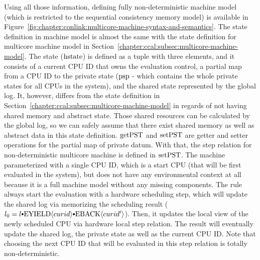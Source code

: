 Using all those information, defining fully non-deterministic machine model (which is restricted to the sequential consistency memory model) 
is available in Figure~\ref{fig:chapter:conlink:multicore-machine-syntax-and-semantics}.
The state definition in machine model is almost the same with the state definition for multicore machine model in Section~\ref{chapter:ccal:subsec:multicore-machine-model}. 
The state (${\mathrm{hstate}}$) is defined as a tuple with three elements, and it consists of a current CPU ID that owns the evaluation control,
a partial map from a CPU ID to the private state (${\mathrm{psp}}$ - which contains the whole private states for all CPUs in the system),
and the shared state represented by the global log. 
It, however, differs from the state definition in Section~\ref{chapter:ccal:subsec:multicore-machine-model} 
in regards of not having shared memory and abstract state. 
Those shared resources can be calculated by the global log, so we can safely assume that 
there exist shared memory as well as abstract data in this state definition. 
${\mathrm{getPST}}$ and ${\mathrm{setPST}}$ are getter and setter operations for the partial map of private datum. 
With that, 
the step relation for non-deterministic multicore machine is defined in ${\mathrm{setPST}}$. 
The machine parameterized with a single CPU ID, which is a start CPU (that will be first evaluated in the system),
but does not have any environmental context at all because it is a full machine model without any missing components. 
The rule always start the evaluation 
with a hardware scheduling step, which will update the shared log via memorizing 
the scheduling result ($l_0 = \listconsoppo{\yieldbackev{curid'}}{\listconsoppo{\yieldev{curid}}{l}}$). 
Then, 
it updates the local view of the newly scheduled CPU via hardware local step relation. 
The result will eventually update the shared log, the private state as well as the current CPU ID. 
Note that choosing the next CPU ID that will be evaluated in this step relation is totally non-deterministic.


